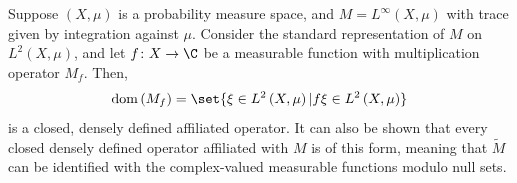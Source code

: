 \documentclass[10pt]{mypackage}
\begin{document}
\begin{example}
  Suppose $\left( X,\mu \right)$ is a probability measure space, and $M = L^{\infty}\left( X,\mu \right)$ with trace given by integration against $\mu$. Consider the standard representation of $M$ on $L^2\left( X,\mu \right)$, and let $f\colon X\rightarrow \C$ be a measurable function with multiplication operator $M_f$. Then, 
  \begin{align*}
    \operatorname{dom}\left( M_f \right) = \set{\xi\in L^2\left( X,\mu \right) | f\xi\in L^2\left( X,\mu \right)}
  \end{align*}
  is a closed, densely defined affiliated operator. It can also be shown that every closed densely defined operator affiliated with $M$ is of this form, meaning that $ \widetilde{M} $ can be identified with the complex-valued measurable functions modulo null sets.
\end{example}
\end{document}
